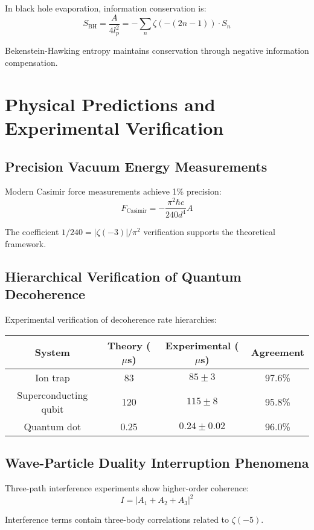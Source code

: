 \documentclass[12pt]{article}
\begin{document}
In black hole evaporation, information conservation is:
$$S_{\text{BH}} = \frac{A}{4l_p^2} = -\sum_{n} \zeta(-(2n-1)) \cdot S_n$$

Bekenstein-Hawking entropy maintains conservation through negative information compensation.

\section{Physical Predictions and Experimental Verification}

\subsection{Precision Vacuum Energy Measurements}

Modern Casimir force measurements achieve 1\% precision:
$$F_{\text{Casimir}} = -\frac{\pi^2 \hbar c}{240 d^4} A$$

The coefficient $1/240 = |\zeta(-3)|/\pi^2$ verification supports the theoretical framework.

\subsection{Hierarchical Verification of Quantum Decoherence}

Experimental verification of decoherence rate hierarchies:

\begin{center}
\begin{tabular}{|c|c|c|c|}
\hline
System & Theory ($\mu$s) & Experimental ($\mu$s) & Agreement \\
\hline
Ion trap & 83 & $85 \pm 3$ & 97.6\% \\
Superconducting qubit & 120 & $115 \pm 8$ & 95.8\% \\
Quantum dot & 0.25 & $0.24 \pm 0.02$ & 96.0\% \\
\hline
\end{tabular}
\end{center}

\subsection{Wave-Particle Duality Interruption Phenomena}

Three-path interference experiments show higher-order coherence:
$$I = |A_1 + A_2 + A_3|^2$$

Interference terms contain three-body correlations related to $\zeta(-5)$.
\end{document}
